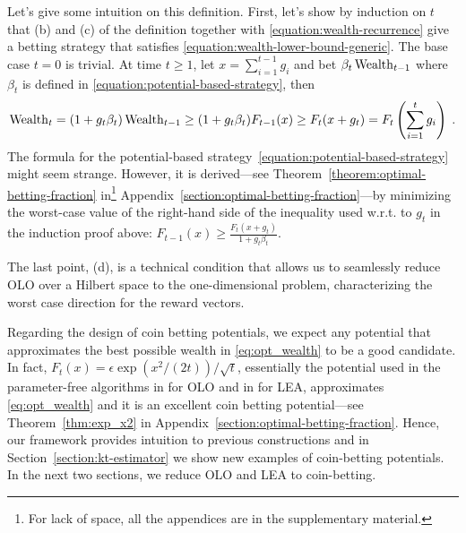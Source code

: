 Let's give some intuition on this definition.  First, let's show by induction
on $t$ that (b) and (c) of the definition together with
\eqref{equation:wealth-recurrence} give a betting strategy that satisfies
\eqref{equation:wealth-lower-bound-generic}. The base case $t=0$ is trivial. At
time $t \ge 1$, let $x = \sum_{i=1}^{t-1} g_i$ and bet $\beta_t \operatorname{Wealth}_{t-1}$
where $\beta_t$ is defined in \eqref{equation:potential-based-strategy}, then
\vspace{-.2cm}
\[
\operatorname{Wealth}_t
= (1+g_t \beta_t) \operatorname{Wealth}_{t-1}
\ge (1 + g_t \beta_t) F_{t-1}(x)
\ge F_t(x + g_t)
= F_t \left( \sum_{i=1}^t g_i \right) \; .
\]
%
The formula for the potential-based
strategy~\eqref{equation:potential-based-strategy} might seem strange. However,
it is derived---see Theorem~\ref{theorem:optimal-betting-fraction}
in\footnote{For lack of space, all the appendices are in the supplementary
material.} Appendix~\ref{section:optimal-betting-fraction}---by minimizing the
worst-case value of the right-hand side of the inequality used w.r.t. to $g_t$
in the induction proof above: $F_{t-1}(x) \ge \tfrac{F_{t}(x +
g_t)}{1+g_t\beta_t}$.

The last point, (d), is a technical condition that allows us to seamlessly
reduce OLO over a Hilbert space to the one-dimensional problem, characterizing
the worst case direction for the reward vectors.

Regarding the design of coin betting potentials, we expect any potential that
approximates the best possible wealth in \eqref{eq:opt_wealth} to be a good
candidate.  In fact, $F_t(x)=\epsilon \exp \left(x^2/(2t)\right)/\sqrt{t}$,
essentially the potential used in the parameter-free algorithms in
\cite{McMahan-Orabona-2014, Orabona-2014} for \ac{OLO} and in
\cite{Chaudhuri-Freund-Hsu-2009, Luo-Schapire-2014, Luo-Schapire-2015} for
\ac{LEA}, approximates \eqref{eq:opt_wealth} and it is an excellent coin
betting potential---see Theorem~\ref{thm:exp_x2} in
Appendix~\ref{section:optimal-betting-fraction}. Hence, our framework provides
intuition to previous constructions and in Section~\ref{section:kt-estimator}
we show new examples of coin-betting potentials. In the next two sections, we
reduce \ac{OLO} and \ac{LEA} to coin-betting.
